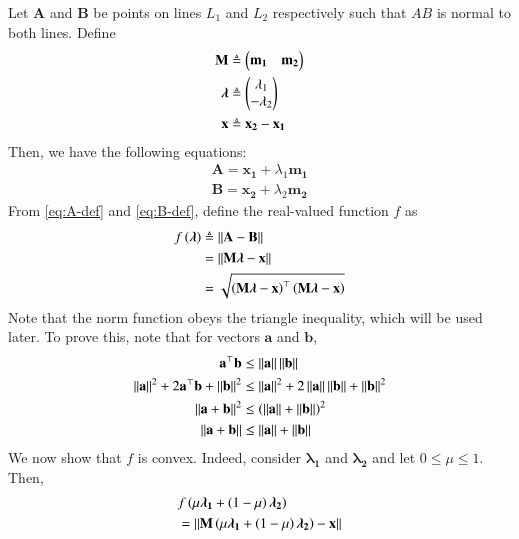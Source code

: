 \documentclass[journal,12pt,twocolumn]{IEEEtran}
\renewcommand{\vec}[1]{\boldsymbol{\mathbf{#1}}}
\begin{document}
\begin{enumerate}
    \solution Let $\vec{A}$ and $\vec{B}$ be points on lines $L_1$ and $L_2$
    respectively such that $AB$ is normal to both lines. Define
    \begin{align}
        \vec{M} &\triangleq \myvec{\vec{m_1} & \vec{m_2}} \label{eq:M-def} \\
        \vec{\lambda} &\triangleq \myvec{\lambda_1\\-\lambda_2} \label{eq:lambda-def} \\
        \vec{x} &\triangleq \vec{x_2} - \vec{x_1} \label{eq:x-def}
    \end{align}
    Then, we have the following equations:
    \begin{align}
        \vec{A} = \vec{x_1} + \lambda_1\vec{m_1} \label{eq:A-def} \\
        \vec{B} = \vec{x_2} + \lambda_2\vec{m_2} \label{eq:B-def}
    \end{align}
    From \eqref{eq:A-def} and \eqref{eq:B-def}, define the real-valued function
    $f$ as
    \begin{align}
        f\brak{\vec{\lambda}} &\triangleq \norm{\vec{A}-\vec{B}} \\
                              &= \norm{\vec{M}\vec{\lambda}-\vec{x}} \\
                              &= \sqrt{\brak{\vec{M\lambda}-\vec{x}}^\top\brak{\vec{M\lambda}-\vec{x}}}
        \label{eq:f-def}
    \end{align}
    Note that the norm function obeys the triangle inequality, which will be
    used later. To prove this, note that for vectors $\vec{a}$ and $\vec{b}$,
    \begin{align}
        \vec{a}^\top\vec{b} &\le \norm{\vec{a}}\norm{\vec{b}} \\
        \norm{\vec{a}}^2 + 2\vec{a}^\top\vec{b} + \norm{\vec{b}}^2 &\le \norm{\vec{a}}^2 + 2\norm{\vec{a}}\norm{\vec{b}} + \norm{\vec{b}}^2 \\
        \norm{\vec{a}+\vec{b}}^2 &\le \brak{\norm{\vec{a}}+\norm{\vec{b}}}^2 \\
        \norm{\vec{a}+\vec{b}} &\le \norm{\vec{a}}+\norm{\vec{b}}
        \label{eq:triangle-ineq}
    \end{align}
    We now show that $f$ is convex. Indeed, consider $\vec{\lambda_1}$ and 
    $\vec{\lambda_2}$ and let $0 \le \mu \le 1$. Then,
    \begin{align}
        &f\brak{\mu\vec{\lambda_1}+\brak{1-\mu}\vec{\lambda_2}} \\
        &= \norm{\vec{M}\brak{\mu\vec{\lambda_1}+\brak{1-\mu}\vec{\lambda_2}}-\vec{x}} \\

\end{align}
\end{enumerate}
\end{document}
